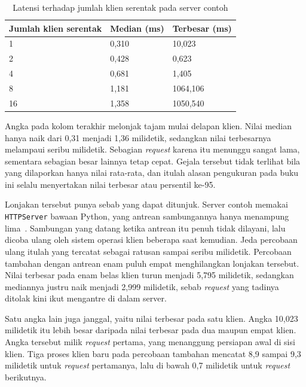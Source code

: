 \begin{table}[htbp]
  \centering
  \caption{Latensi terhadap jumlah klien serentak pada server contoh}
  \label{tab:biaya-cs}
  \begin{tabularx}{\textwidth}{|X|l|l|}
    \hline
    \textbf{Jumlah klien serentak} & \textbf{Median (ms)} & \textbf{Terbesar (ms)} \\
    \hline
    1 & 0,310 & 10,023 \\
    \hline
    2 & 0,428 & 0,623 \\
    \hline
    4 & 0,681 & 1,405 \\
    \hline
    8 & 1,181 & 1064,106 \\
    \hline
    16 & 1,358 & 1050,540 \\
    \hline
  \end{tabularx}
\end{table}

Angka pada kolom terakhir melonjak tajam mulai delapan klien. Nilai median
hanya
naik dari 0,31 menjadi 1,36 milidetik, sedangkan nilai terbesarnya melampaui
seribu milidetik. Sebagian \textit{request} karena itu menunggu sangat lama, sementara
sebagian besar lainnya tetap cepat. Gejala tersebut tidak terlihat bila yang
dilaporkan hanya nilai rata-rata, dan itulah alasan pengukuran pada buku ini
selalu menyertakan nilai terbesar atau persentil ke-95.

Lonjakan tersebut punya sebab yang dapat ditunjuk. Server contoh memakai
\texttt{HTTPServer} bawaan Python, yang antrean sambungannya hanya menampung
lima~\cite{python2026socketserver}. Sambungan yang datang ketika antrean itu
penuh tidak dilayani, lalu dicoba ulang oleh sistem operasi klien beberapa saat
kemudian. Jeda percobaan ulang itulah yang tercatat sebagai ratusan sampai
seribu milidetik. Percobaan tambahan dengan antrean enam puluh empat
menghilangkan lonjakan tersebut. Nilai terbesar pada enam belas klien turun
menjadi 5,795 milidetik, sedangkan mediannya justru naik menjadi 2,999
milidetik, sebab \textit{request} yang tadinya ditolak kini ikut mengantre di
dalam server.

Satu angka lain juga janggal, yaitu nilai terbesar pada satu klien. Angka
10,023 milidetik itu lebih besar daripada nilai terbesar pada dua maupun empat
klien. Angka tersebut milik \textit{request} pertama, yang menanggung persiapan
awal di sisi klien. Tiga proses klien baru pada percobaan tambahan mencatat 8,9
sampai 9,3 milidetik untuk \textit{request} pertamanya, lalu di bawah 0,7
milidetik untuk \textit{request} berikutnya.


